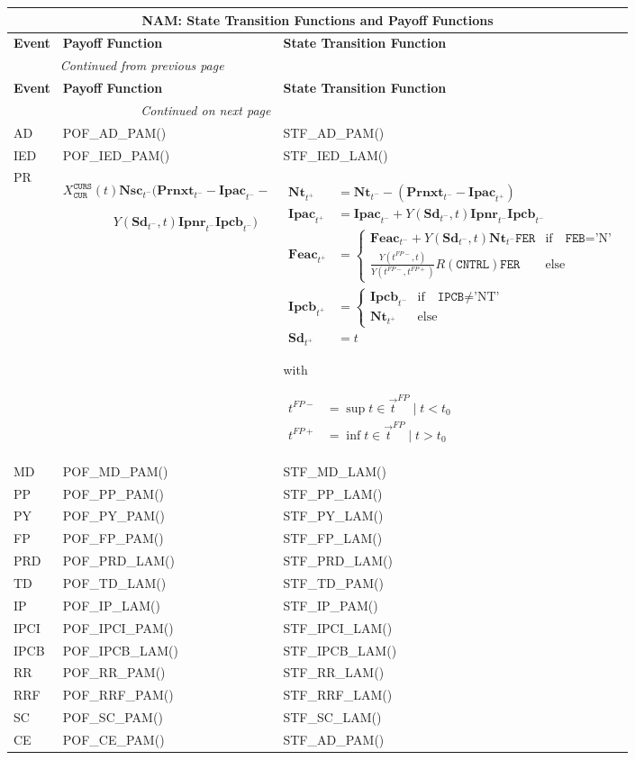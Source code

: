 \documentclass[9pt,oneside]{amsart}
\newenvironment{functions}[1]{
	\hfill %
    	\begin{longtable}{| p{0.05\textwidth} | p{0.42\textwidth} |  p{0.48\textwidth} |}
	\multicolumn{3}{c}{\textbf{#1: State Transition Functions and Payoff Functions}}\\
	\hline
	\textbf{Event} & \textbf{Payoff Function} & \textbf{State Transition Function}\\
	\hline
	\endfirsthead
	\multicolumn{2}{c}{\textit{Continued from previous page}} \\
	\hline
	\textbf{Event} & \textbf{Payoff Function} & \textbf{State Transition Function}\\
	\hline
	\endhead
	\hline \multicolumn{2}{r}{\textit{Continued on next page}} \\
	\endfoot
	\endlastfoot
}{%
	\hline
    	\end{longtable}
}
\newcommand{\svar}[2]{\textbf{#1}_{#2}}
\newcommand{\attr}[1]{\texttt{#1}}
\newcommand{\stf}[2]{STF\_#1\_#2()}
\newcommand{\pof}[2]{POF\_#1\_#2()}
\newcommand{\sgn}{R(\attr{CNTRL})}
\newcommand{\yfr}[2]{Y(#1,#2)}
\begin{document}
\begin{functions}{NAM}
	AD & \pof{AD}{PAM} & \stf{AD}{PAM} \\
	\hline
	IED & \pof{IED}{PAM} & \stf{IED}{LAM} \\
	\hline
	PR & $X_{\attr{CUR}}^{\attr{CURS}}(t)\svar{Nsc}{t^-}(\svar{Prnxt}{t^-}-\svar{Ipac}{t^-}-$\par $\qquad\qquad \yfr{\svar{Sd}{t^-}}{t}\svar{Ipnr}{t^-}\svar{Ipcb}{t^-})$
		& {$\begin{aligned}
			\svar{Nt}{t^+} &= \svar{Nt}{t^-}-(\svar{Prnxt}{t^-}-\svar{Ipac}{t^+}) \\
			\svar{Ipac}{t^+} &= \svar{Ipac}{t^-} + \yfr{\svar{Sd}{t^-}}{t}\svar{Ipnr}{t^-}\svar{Ipcb}{t^-} \\
			\svar{Feac}{t^+} &= \begin{cases} \svar{Feac}{t^-} + \yfr{\svar{Sd}{t^-}}{t}\svar{Nt}{t^-}\attr{FER} & \text{if} \quad \attr{FEB}=\text{'N'} \\
					\frac{\yfr{t^{FP-}}{t}}{\yfr{t^{FP-}}{t^{FP+}}}\sgn\attr{FER} & \text{else} \end{cases} \\
			\svar{Ipcb}{t^+} &= \begin{cases} \svar{Ipcb}{t^-} & \text{if}\quad \attr{IPCB}\neq\text{'NT'} \\
							\svar{Nt}{t^+} & \text{else} \end{cases}\\
			\svar{Sd}{t^+} &= t \end{aligned}$} \par
	with\par
		{$\begin{aligned}
			t^{FP-} &= \sup t \in \vec{t}^{FP}\mid t<t_0 \\
			t^{FP+} &= \inf t \in \vec{t}^{FP}\mid t>t_0 \end{aligned}$} \\
	\hline
	MD & \pof{MD}{PAM} & \stf{MD}{LAM} \\
	\hline
	PP & \pof{PP}{PAM}
		& \stf{PP}{LAM} \\
	\hline
	PY & \pof{PY}{PAM}
		& \stf{PY}{LAM} \\
	\hline
	FP & \pof{FP}{PAM}
		& \stf{FP}{LAM} \\
	\hline
  	PRD & \pof{PRD}{LAM}
		& \stf{PRD}{LAM} \\
	\hline
  	TD & \pof{TD}{LAM}
		& \stf{TD}{PAM} \\
	\hline
	IP & \pof{IP}{LAM}
		& \stf{IP}{PAM} \\
	\hline
	IPCI & \pof{IPCI}{PAM}
		& \stf{IPCI}{LAM} \\
	\hline
	IPCB & \pof{IPCB}{LAM}
		& \stf{IPCB}{LAM} \\
	\hline
	RR & \pof{RR}{PAM}
		& \stf{RR}{LAM} \\
	\hline
	RRF & \pof{RRF}{PAM}
		& \stf{RRF}{LAM} \\
	\hline
	SC & \pof{SC}{PAM}
		& \stf{SC}{LAM} \\
	\hline
	CE & \pof{CE}{PAM} & \stf{AD}{PAM} \\
\end{functions}
\end{document}
